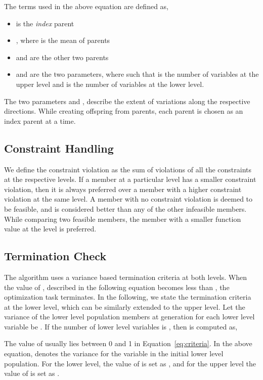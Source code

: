 \documentclass[twoside]{article}
\begin{document}
The terms used in the above equation are defined as,
\begin{itemize}\itemsep1pt \parskip0pt 
	\item  is the {\em index\/} parent
	\item , where  is the mean of  parents
	\item  and  are the other two parents
	\item  and  are the two parameters, where  such that  is the number of variables at the upper level and  is the number of variables at the lower level.
\end{itemize}
The two parameters  and , describe the extent of variations along the respective directions. While creating  offspring from  parents, each parent is chosen as an index parent at a time.

\subsection{Constraint Handling}
We define the constraint violation as the sum of violations of all the constraints at the respective levels. If a member at a particular level has a smaller constraint violation, then it is always preferred over a member with a higher constraint violation at the same level. A member with no constraint violation is deemed to be feasible, and is considered better than any of the other infeasible members. While comparing two feasible members, the member with a smaller function value at the level is preferred.

\subsection{Termination Check}
\label{sec:termination}
The algorithm uses a variance based termination criteria at both levels. When the value of , described in the following equation becomes less than , the optimization task terminates. In the following, we state the termination criteria at the lower level, which can be similarly extended to the upper level. Let the variance of the lower level population members at generation  for each lower level variable  be . If the number of lower level variables is , then  is computed as,

The value of  usually lies between 0 and 1 in Equation~\ref{eq:criteria}. In the above equation,  denotes the variance for the variable  in the initial lower level population. For the lower level, the value of  is set as , and for the upper level the value of  is set as .
\end{document}

